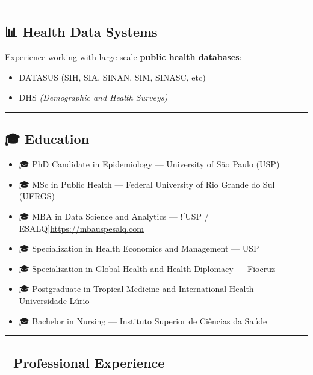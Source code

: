 \documentclass[
]{article}
\providecommand{\tightlist}{%
  \setlength{\itemsep}{0pt}\setlength{\parskip}{0pt}}
\begin{document}
\begin{center}\rule{0.5\linewidth}{0.5pt}\end{center}

\subsection{📊 Health Data Systems}\label{health-data-systems}

Experience working with large-scale \textbf{public health databases}:

\begin{itemize}
\tightlist
\item
  DATASUS (SIH, SIA, SINAN, SIM, SINASC, etc)
\item
  DHS \emph{(Demographic and Health Surveys)}
\end{itemize}

\begin{center}\rule{0.5\linewidth}{0.5pt}\end{center}

\subsection{🎓 Education}\label{education}

\begin{itemize}
\tightlist
\item
  🎓 PhD Candidate in Epidemiology --- University of São Paulo (USP)
\item
  🎓 MSc in Public Health --- Federal University of Rio Grande do Sul
  (UFRGS)
\item
  🎓 MBA in Data Science and Analytics --- !{[}USP /
  ESALQ{]}\url{https://mbauspesalq.com}
\item
  🎓 Specialization in Health Economics and Management --- USP
\item
  🎓 Specialization in Global Health and Health Diplomacy --- Fiocruz
\item
  🎓 Postgraduate in Tropical Medicine and International Health ---
  Universidade Lúrio
\item
  🎓 Bachelor in Nursing --- Instituto Superior de Ciências da Saúde
\end{itemize}

\begin{center}\rule{0.5\linewidth}{0.5pt}\end{center}

\subsection{🏥 Professional Experience}\label{professional-experience}
\end{document}
